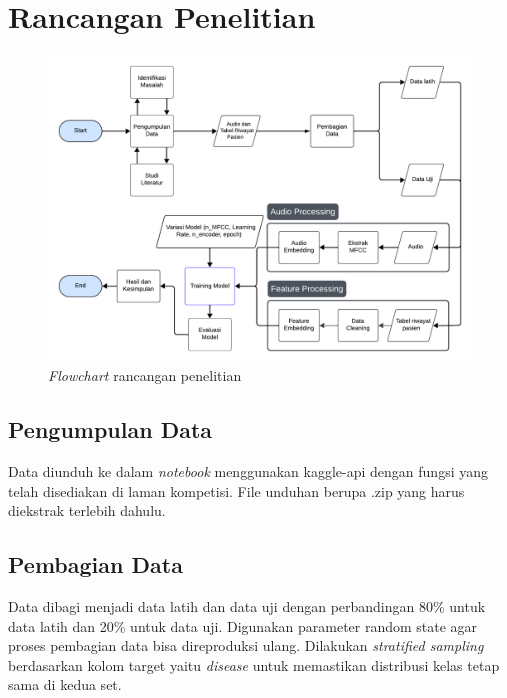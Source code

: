 \section{Rancangan Penelitian}
\begin{figure}[H]
    \centering
    \includegraphics[width=1\linewidth]{gambar/Flowchart Rancangan Penelitian.pdf}
    \caption{\textit{Flowchart} rancangan penelitian}
    \label{fig:flowchart}
\end{figure}

    \subsection{Pengumpulan Data}
    Data diunduh ke dalam \textit{notebook} menggunakan kaggle-api dengan fungsi yang telah disediakan di laman kompetisi. File unduhan berupa .zip yang harus diekstrak terlebih dahulu.

    \subsection{Pembagian Data}
    Data dibagi menjadi data latih dan data uji dengan perbandingan 80\% untuk data latih dan 20\% untuk data uji. Digunakan parameter random state agar proses pembagian data bisa direproduksi ulang. Dilakukan \textit{stratified sampling} berdasarkan kolom target yaitu \textit{disease} untuk memastikan distribusi kelas tetap sama di kedua set.

